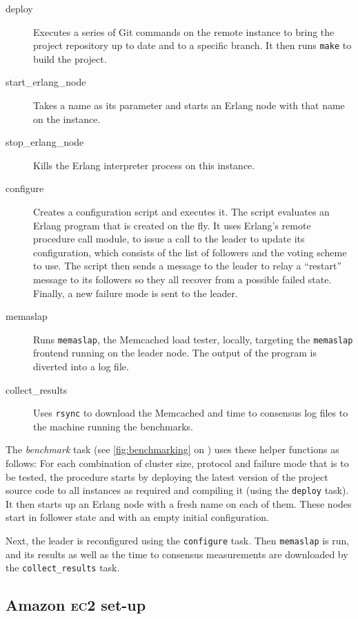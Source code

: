 \documentclass[12pt,chapterprefix=true,toc=bibliography,numbers=noendperiod,
               footnotes=multiple,twoside]{scrreprt}
\newcommand{\ECC}[0]{\textsc{ec}2}
\begin{document}
\begin{description}
    \item[deploy] Executes a series of Git commands on the remote instance to bring the project repository up to date and to a specific branch. It then runs \texttt{make} to build the project.
    \item[start\_erlang\_node] Takes a name as its parameter and starts an Erlang node with that name on the instance.
    \item[stop\_erlang\_node] Kills the Erlang interpreter process on this instance.
    \item[configure] Creates a configuration script and executes it. The script evaluates an Erlang program that is created on the fly. It uses Erlang's remote procedure call module, to issue a call to the leader to update its configuration, which consists of the list of followers and the voting scheme to use. The script then sends a message to the leader to relay a \enquote{restart} message to its followers so they all recover from a possible failed state. Finally, a new failure mode is sent to the leader.
    \item[memaslap] Runs \texttt{memaslap}, the Memcached load tester, locally, targeting the \texttt{memaslap} frontend running on the leader node. The output of the program is diverted into a log file.
    \item[collect\_results] Uses \texttt{rsync} to download the Memcached and time to consensus log files to the machine running the benchmarks.
\end{description}

The \textit{benchmark} task (see \cref{fig:benchmarking} on ) uses these helper functions as follows: For each combination of cluster size, protocol and failure mode that is to be tested, the procedure starts by deploying the latest version of the project source code to all instances as required and compiling it (using the \texttt{deploy} task). It then starts up an Erlang node with a fresh name on each of them. These nodes start in follower state and with an empty initial configuration.

Next, the leader is reconfigured using the \texttt{configure} task. Then \texttt{memaslap} is run, and its results as well as the time to consensus measurements are downloaded by the \texttt{collect\_results} task.

\subsection[Amazon EC2 set-up]{Amazon \ECC{} set-up}
\end{document}
